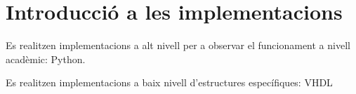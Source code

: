 

\chapter{Introducció a les implementacions}


Es realitzen implementacions a alt nivell per a observar el funcionament a nivell acadèmic: Python.

Es realitzen implementacions a baix nivell d'estructures específiques: VHDL




















